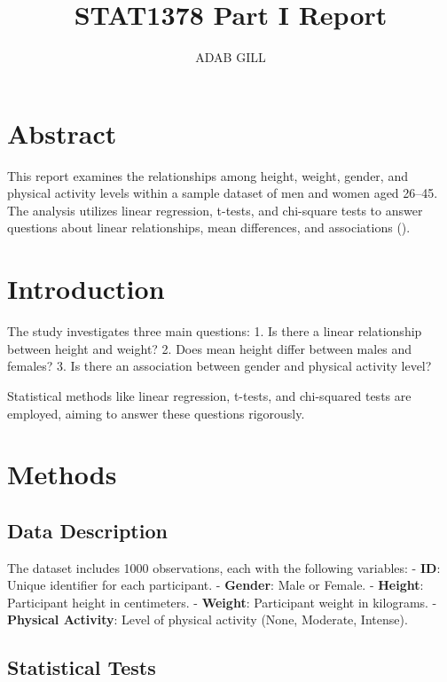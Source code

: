 \documentclass[
]{article}
\title{STAT1378 Part I Report}
\author{ADAB GILL}
\date{}
\begin{document}
\maketitle

\section{Abstract}\label{abstract}

This report examines the relationships among height, weight, gender, and
physical activity levels within a sample dataset of men and women aged
26--45. The analysis utilizes linear regression, t-tests, and chi-square
tests to answer questions about linear relationships, mean differences,
and associations ().

\section{Introduction}\label{introduction}

The study investigates three main questions: 1. Is there a linear
relationship between height and weight? 2. Does mean height differ
between males and females? 3. Is there an association between gender and
physical activity level?

Statistical methods like linear regression, t-tests, and chi-squared
tests are employed, aiming to answer these questions rigorously.

\section{Methods}\label{methods}

\subsection{Data Description}\label{data-description}

The dataset includes 1000 observations, each with the following
variables: - \textbf{ID}: Unique identifier for each participant. -
\textbf{Gender}: Male or Female. - \textbf{Height}: Participant height
in centimeters. - \textbf{Weight}: Participant weight in kilograms. -
\textbf{Physical Activity}: Level of physical activity (None, Moderate,
Intense).

\subsection{Statistical Tests}\label{statistical-tests}
\end{document}
